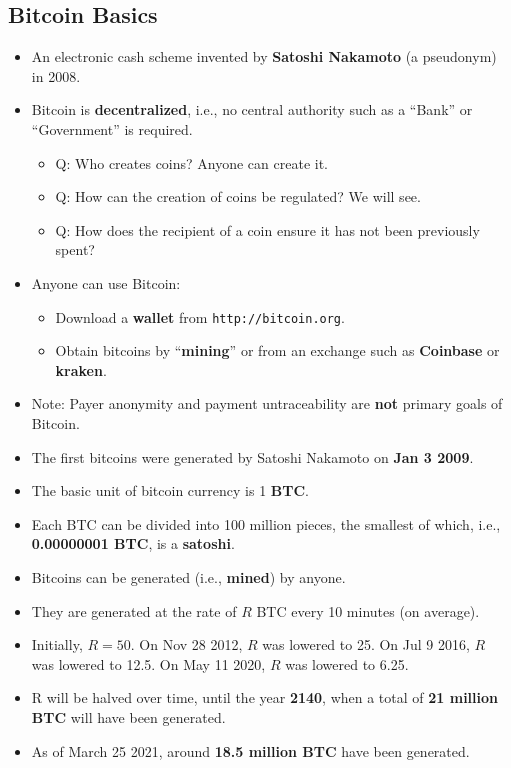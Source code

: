 \documentclass[12pt,titlepage]{article}
\begin{document}
\subsection{Bitcoin Basics}
\begin{itemize}
	\item An electronic cash scheme invented by \textbf{Satoshi Nakamoto} (a pseudonym) in 2008.
	\item Bitcoin is \textbf{decentralized}, i.e., no central authority such as a ``Bank'' or ``Government'' is required.\begin{itemize}
		\item Q: Who creates coins? Anyone can create it.
		\item Q: How can the creation of coins be regulated? We will see. 
		\item Q: How does the recipient of a coin ensure it has not been previously spent?
	\end{itemize}
	\item Anyone can use Bitcoin:\begin{itemize}
		\item Download a \textbf{wallet} from \texttt{http://bitcoin.org}.
		\item Obtain bitcoins by ``\textbf{mining}'' or from an exchange such as \textbf{Coinbase} or \textbf{kraken}.
	\end{itemize}
	\item Note: Payer anonymity and payment untraceability are \textbf{not} primary goals of Bitcoin.
	\item The first bitcoins were generated by Satoshi Nakamoto on \textbf{Jan 3 2009}.
	\item The basic unit of bitcoin currency is 1 \textbf{BTC}.
	\item Each BTC can be divided into 100 million pieces, the smallest of which, i.e., \textbf{0.00000001 BTC}, is a \textbf{satoshi}.
	\item Bitcoins can be generated (i.e., \textbf{mined}) by anyone.
	\item They are generated at the rate of $R$ BTC every 10 minutes (on average).
	\item Initially, $R = 50$. On Nov 28 2012, $R$ was lowered to 25. On Jul 9 2016, $R$ was lowered to 12.5. On May 11 2020, $R$ was lowered to 6.25.
	\item R will be halved over time, until the year \textbf{2140}, when a total of \textbf{21 million BTC} will have been generated.
	\item As of March 25 2021, around \textbf{18.5 million BTC} have been generated.
\end{itemize}
\end{document}
